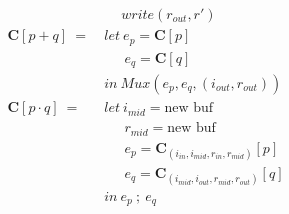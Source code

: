 \documentclass[12pt, letterpaper]{article}
\begin{document}
{\begin{align*}
             &\quad \ write(r_{out}, r')
             \\
         \mathbf{C}[p + q]\ 
             =\ &
             let\ e_p = \mathbf{C}[p]\\
             &\quad\ \ e_q = \mathbf{C}[q]\\
             &in\ Mux(e_p, e_q, (i_{out},r_{out}))
             \\
         \mathbf{C}[p \cdot q]\ 
             =\ &
             let\ i_{mid} = \text{new buf}\\
             &\quad\ \ r_{mid} = \text{new buf}\\
             &\quad\ \ e_p = \mathbf{C}_{(i_{in}, i_{mid}, r_{in}, r_{mid})}[p]\\
             &\quad\ \ e_q = \mathbf{C}_{(i_{mid}, i_{out}, r_{mid}, r_{out})}[q]\\
             &in\ e_p\ ;\ e_q
     \end{align*}
 }
\end{document}
